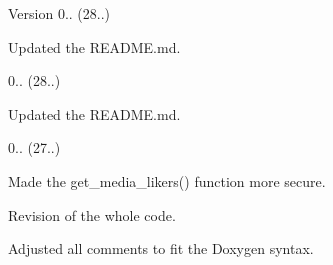 \begin{DoxyVersion}{Version}
0.. (28..)
\begin{DoxyItemize}
\item Updated the R\+E\+A\+D\+M\+E.\+md. 
\end{DoxyItemize}

0.. (28..)
\begin{DoxyItemize}
\item Updated the R\+E\+A\+D\+M\+E.\+md. 
\end{DoxyItemize}

0.. (27..)
\begin{DoxyItemize}
\item Made the get\+\_\+media\+\_\+likers() function more secure.
\item Revision of the whole code.
\item Adjusted all comments to fit the Doxygen syntax. 
\end{DoxyItemize}
\end{DoxyVersion}
